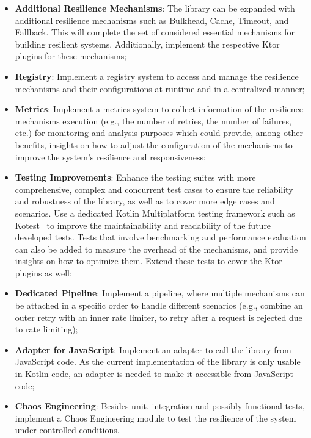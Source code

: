 \begin{itemize}
    \item \textbf{Additional Resilience Mechanisms}:
    The library can be expanded with additional resilience mechanisms such as Bulkhead,
    Cache, Timeout, and Fallback.
    This will complete the set of considered essential mechanisms for building resilient systems.
    Additionally, implement the respective Ktor plugins for these mechanisms;
    \item \textbf{Registry}:
    Implement a registry system
    to access and manage the resilience mechanisms and their configurations at runtime and in a centralized manner;
    \item \textbf{Metrics}:
    Implement a metrics system to collect information of the resilience mechanisms execution (e.g., the number of retries, the number of failures, etc.) for monitoring and analysis purposes which could provide, among other benefits, insights on how to adjust the configuration of the mechanisms to improve the system's resilience and responsiveness;
    \item \textbf{Testing Improvements}:
    Enhance the testing suites with more comprehensive, complex and concurrent test cases
    to ensure the reliability and robustness of the library, as well as to cover more edge cases and scenarios.
    Use a dedicated Kotlin Multiplatform testing framework such as Kotest~\cite{kotest}
    to improve the maintainability and readability of the future developed tests.
    Tests that involve benchmarking and performance evaluation can also be added to measure the overhead of the mechanisms,
    and provide insights on how to optimize them.
    Extend these tests to cover the Ktor plugins as well;
    \item \textbf{Dedicated Pipeline}:
    Implement a pipeline,
    where multiple mechanisms can be attached in a specific order to handle different scenarios (e.g., combine an outer retry with an inner rate limiter, to retry after a request is rejected due to rate limiting);
    \item \textbf{Adapter for JavaScript}: Implement an adapter to call the library from JavaScript code.
    As the current implementation of the library is only usable in Kotlin code, an adapter is needed to make it accessible from JavaScript code;
    \item \textbf{Chaos Engineering}: Besides unit, integration and possibly functional tests, implement a Chaos Engineering module to test the resilience of the system under controlled conditions.

\end{itemize}
